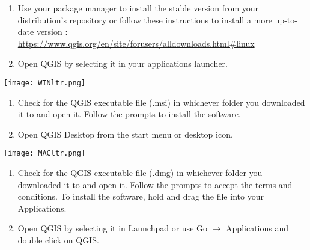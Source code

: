 \documentclass[oneside,a4paper,11pt,explicit]{book}
\begin{document}

\begin{tcolorbox}[colback=yellow!5!,title=\flushright{Linux \hspace{.25em} \texttt{[image: LinuxLogo.png]}}]
	\begin{enumerate}
		\item Use your package manager to install the stable version from your distribution's repository or follow these instructions to install a more up-to-date version : \href{https://www.qgis.org/en/site/forusers/alldownloads.html#linux}{https://www.qgis.org/en/site/forusers/alldownloads.html\#linux}
		\item Open QGIS by selecting it in your applications launcher.
	\end{enumerate}
\end{tcolorbox}

\begin{tcolorbox}[colback=yellow!5!white,colframe=blue!60!green,title=\flushright{Windows \hspace{.25em} \texttt{[image: WindowsLogo.png]}}]
	\centerline{\texttt{[image: WINltr.png]}}
	\begin{enumerate}
		\item Check for the QGIS executable file (.msi) in whichever folder you downloaded it to and open it. Follow the prompts to install the software.
		\item Open QGIS Desktop from the start menu or desktop icon.
	\end{enumerate}
\end{tcolorbox}

\begin{tcolorbox}[colback=yellow!5!white,colframe=MACred,title=\flushright{Apple macOS \hspace{.25em} \texttt{[image: AppleLogo.png]}}]
	\centerline{\texttt{[image: MACltr.png]}}
	\begin{enumerate}
		\item Check for the QGIS executable file (.dmg) in whichever folder you downloaded it to and open it. Follow the prompts to accept the terms and conditions. To install the software, hold and drag the file into your Applications.
		\item Open QGIS by selecting it in Launchpad or use Go $\rightarrow$ Applications and double click on QGIS.
	\end{enumerate}
\end{tcolorbox}
\end{document}
